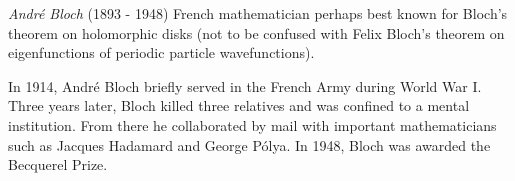 \documentclass[12pt]{article}
\begin{document}
\emph{Andr\'e Bloch} (1893 - 1948) French mathematician perhaps best known for Bloch's theorem on holomorphic disks (not to be confused with Felix Bloch's theorem on eigenfunctions of periodic particle wavefunctions).

In 1914, Andr\'e Bloch briefly served in the French Army during World War I. Three years later, Bloch killed three relatives and was confined to a mental institution. From there he collaborated by mail with important mathematicians such as Jacques Hadamard and George P\'olya. In 1948, Bloch was awarded the Becquerel Prize.
\end{document}
